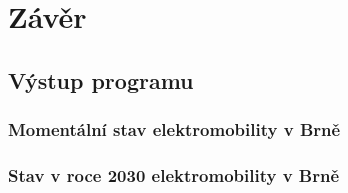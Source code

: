 \documentclass[a4paper,11pt]{article}
\begin{document}
\section{Závěr}

\subsection{Výstup programu}

\subsubsection{Momentální stav elektromobility v Brně}

\subsubsection{Stav v roce 2030 elektromobility v Brně}

\newpage

      
\end{document}
